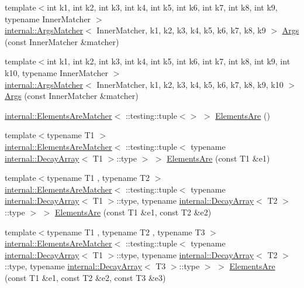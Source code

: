 \begin{DoxyCompactItemize}
\item 
{\footnotesize template$<$int k1, int k2, int k3, int k4, int k5, int k6, int k7, int k8, int k9, typename Inner\+Matcher $>$ }\\\hyperlink{classtesting_1_1internal_1_1ArgsMatcher}{internal\+::\+Args\+Matcher}$<$ Inner\+Matcher, k1, k2, k3, k4, k5, k6, k7, k8, k9 $>$ \hyperlink{namespacetesting_a62c877e01fb9098cd3c399f921bf4e3e}{Args} (const Inner\+Matcher \&matcher)
\item 
{\footnotesize template$<$int k1, int k2, int k3, int k4, int k5, int k6, int k7, int k8, int k9, int k10, typename Inner\+Matcher $>$ }\\\hyperlink{classtesting_1_1internal_1_1ArgsMatcher}{internal\+::\+Args\+Matcher}$<$ Inner\+Matcher, k1, k2, k3, k4, k5, k6, k7, k8, k9, k10 $>$ \hyperlink{namespacetesting_a09ac462e8d6ed468cbfaa9c767aee0aa}{Args} (const Inner\+Matcher \&matcher)
\item 
\hyperlink{classtesting_1_1internal_1_1ElementsAreMatcher}{internal\+::\+Elements\+Are\+Matcher}$<$ \+::testing\+::tuple$<$$>$ $>$ \hyperlink{namespacetesting_a79cf4ae694bf8231dcf283b325405f27}{Elements\+Are} ()
\item 
{\footnotesize template$<$typename T1 $>$ }\\\hyperlink{classtesting_1_1internal_1_1ElementsAreMatcher}{internal\+::\+Elements\+Are\+Matcher}$<$ \+::testing\+::tuple$<$ typename \hyperlink{structtesting_1_1internal_1_1DecayArray}{internal\+::\+Decay\+Array}$<$ T1 $>$\+::type $>$ $>$ \hyperlink{namespacetesting_aa35aa6c9638d989e9f4aaa6009f60589}{Elements\+Are} (const T1 \&e1)
\item 
{\footnotesize template$<$typename T1 , typename T2 $>$ }\\\hyperlink{classtesting_1_1internal_1_1ElementsAreMatcher}{internal\+::\+Elements\+Are\+Matcher}$<$ \+::testing\+::tuple$<$ typename \hyperlink{structtesting_1_1internal_1_1DecayArray}{internal\+::\+Decay\+Array}$<$ T1 $>$\+::type, typename \hyperlink{structtesting_1_1internal_1_1DecayArray}{internal\+::\+Decay\+Array}$<$ T2 $>$\+::type $>$ $>$ \hyperlink{namespacetesting_a864f77fe7774308d4c54f1f52f9040cf}{Elements\+Are} (const T1 \&e1, const T2 \&e2)
\item 
{\footnotesize template$<$typename T1 , typename T2 , typename T3 $>$ }\\\hyperlink{classtesting_1_1internal_1_1ElementsAreMatcher}{internal\+::\+Elements\+Are\+Matcher}$<$ \+::testing\+::tuple$<$ typename \hyperlink{structtesting_1_1internal_1_1DecayArray}{internal\+::\+Decay\+Array}$<$ T1 $>$\+::type, typename \hyperlink{structtesting_1_1internal_1_1DecayArray}{internal\+::\+Decay\+Array}$<$ T2 $>$\+::type, typename \hyperlink{structtesting_1_1internal_1_1DecayArray}{internal\+::\+Decay\+Array}$<$ T3 $>$\+::type $>$ $>$ \hyperlink{namespacetesting_a0be8a0ad5d7461fd1da13ecac4e21e2a}{Elements\+Are} (const T1 \&e1, const T2 \&e2, const T3 \&e3)
$$
\end{DoxyCompactItemize}
